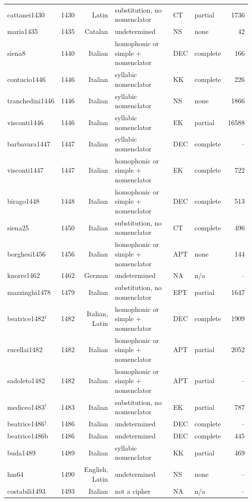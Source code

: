 {\begin{longtable}{@{}llrlllr@{}}
cattanei1430 & 1430 & Latin & substitution, no nomenclator & CT & partial & 1736 \\
maria1435 & 1435 & Catalan & undetermined & NS & none & 42 \\
siena8 & 1440 & Italian & homophonic or simple + nomenclator & DEC & complete & 166 \\
contucio1446 & 1446 & Italian & syllabic nomenclator & KK & complete & 226 \\
tranchedini1446 & 1446 & Italian & syllabic nomenclator & NS & none & 1866 \\
visconti1446 & 1446 & Italian & syllabic nomenclator & EK & partial & 16588 \\
barbavara1447 & 1447 & Italian & syllabic nomenclator & DEC & complete & -- \\
visconti1447 & 1447 & Italian & homophonic or simple + nomenclator & EK & complete & 722 \\
birago1448 & 1448 & Italian & homophonic or simple + nomenclator & DEC & complete & 513 \\
siena25 & 1450 & Italian & substitution, no nomenclator & CT & complete & 496 \\
borghesi1456 & 1456 & Italian & homophonic or simple + nomenclator & APT & none & 144 \\
knorre1462 & 1462 & German & undetermined & NA & n/a & -- \\
mazzinghi1478 & 1479 & Italian & substitution, no nomenclator & EPT & partial & 1647 \\
beatrice1482$^\dagger$ & 1482 & Italian, Latin & homophonic or simple + nomenclator & DEC & complete & 1909 \\
rucellai1482 & 1482 & Italian & homophonic or simple + nomenclator & APT & partial & 2052 \\
sadoleto1482 & 1482 & Italian & homophonic or simple + nomenclator & APT & partial & -- \\
mediceo1483$^\dagger$ & 1483 & Italian & substitution, no nomenclator & EK & partial & 787 \\
beatrice1486$^\dagger$ & 1486 & Italian & undetermined & DEC & complete & -- \\
beatrice1486b & 1486 & Italian & undetermined & DEC & complete & 445 \\
buda1489 & 1489 & Italian & syllabic nomenclator & KK & partial & 469 \\
hm64 & 1490 & English, Latin & undetermined & NS & none & -- \\
costabili1493 & 1493 & Italian & not a cipher & NA & n/a & -- \\

\end{longtable}}
